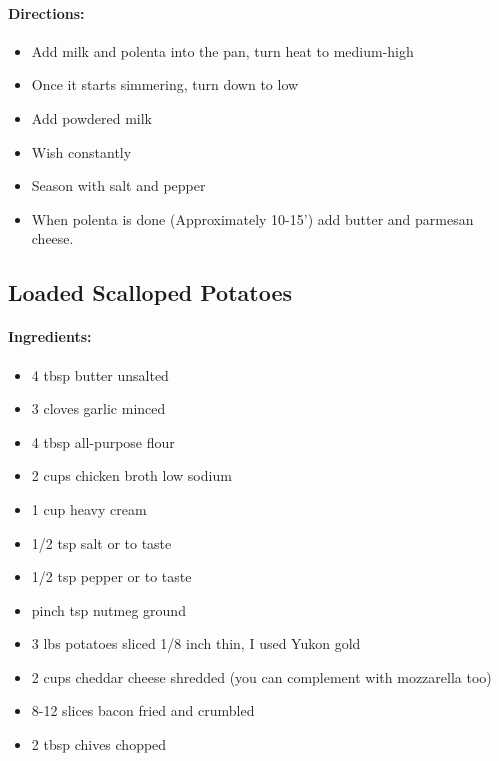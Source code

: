 \documentclass{article}
\begin{document}
\paragraph{Directions:}
\begin{itemize}
    \item Add milk and polenta into the pan, turn heat to medium-high
    \item Once it starts simmering, turn down to low
    \item Add powdered milk
    \item Wish constantly
    \item Season with salt and pepper
    \item When polenta is done (Approximately 10-15’) add butter and parmesan cheese.
\end{itemize}

\subsection{Loaded Scalloped Potatoes}

\paragraph{Ingredients:}
\begin{itemize}
    \item 4 tbsp butter unsalted
    \item 3 cloves garlic minced
    \item 4 tbsp all-purpose flour
    \item 2 cups chicken broth low sodium
    \item 1 cup heavy cream
    \item 1/2 tsp salt or to taste
    \item 1/2 tsp pepper or to taste
    \item pinch tsp nutmeg ground
    \item 3 lbs potatoes sliced 1/8 inch thin, I used Yukon gold
    \item 2 cups cheddar cheese shredded (you can complement with mozzarella too)
    \item 8-12 slices bacon fried and crumbled
    \item 2 tbsp chives chopped
\end{itemize}
\end{document}
